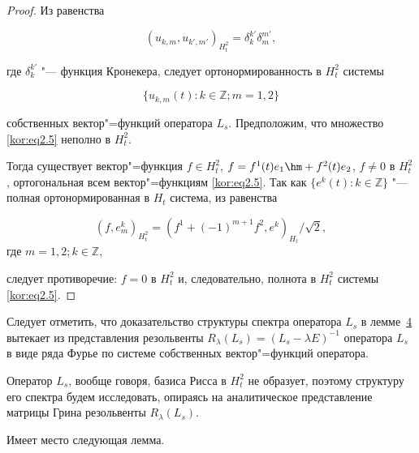\begin{proof} Из равенства 

$$

(u_{k,m},u_{k',m'})_{H_t^2}=\delta_k^{k'}\delta_m^{m'},

$$ 

где $\delta_k^{k'}$ "--- функция Кронекера, следует ортонормированность в $H_t^2$ системы

\begin{equation}

\label{kor:eq2.5}

\{u_{k,m}(t):k\in\mathbb{Z};m=1,2\}

\end{equation}

собственных вектор"=функций оператора $L_s$. Предположим, что множество \eqref{kor:eq2.5} неполно в $H_t^2$. 

Тогда существует вектор"=функция $f\in H_t^2$, $f=f^1(t)e_1\hm +f^2(t)e_2$, $f\ne0$ в $H_t^2$, ортогональная всем вектор"=функциям \eqref{kor:eq2.5}. Так как $\{e^k(t):k\in\mathbb{Z}\}$ "--- полная ортонормированная в $H_t$ система,  из равенства 

$$(f,e_m^k)_{H_t^2}=(f^1+(-1)^{m+1}f^2,e^k)_{H_t}/\sqrt2,$$ где $m=1,2; k\in\mathbb{Z},$

следует противоречие: $f=0$ в $H_t^2$ и, следовательно, полнота в $H_t^2$ системы \eqref{kor:eq2.5}.  \end{proof}



\smallskip



Следует отметить, что доказательство структуры спектра оператора $L_s$ в лемме~\hyperlink{korn:lemma:4}{4} вытекает из представления резольвенты $R_\lambda(L_s)=(L_s-\lambda E)^{-1}$ оператора $L_s$ в виде ряда Фурье по системе собственных вектор"=функций оператора. 

Оператор $L_s$, вообще говоря, базиса Рисса в $H_t^2$ не образует, поэтому структуру его спектра будем исследовать, опираясь на аналитическое представление матрицы Грина резольвенты $R_\lambda(L_s)$. 

Имеет место следующая лемма.



\smallskip



\hypertarget{korn:lemma:5}{}



